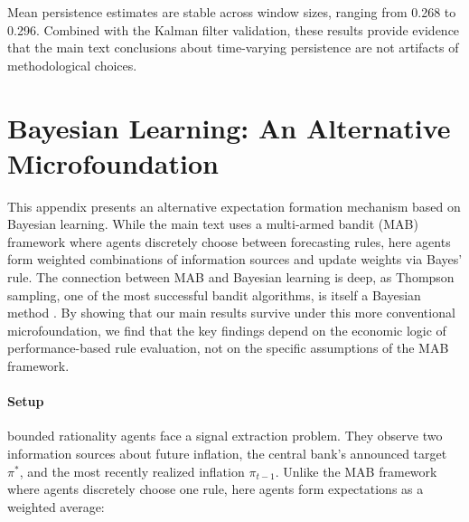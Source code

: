 \documentclass[10pt]{article}
\begin{document}
Mean persistence estimates are stable across window sizes, ranging from 0.268 to 0.296. Combined with the Kalman filter validation, these results provide evidence that the main text conclusions about time-varying persistence are not artifacts of methodological choices.



\section{Bayesian Learning: An Alternative Microfoundation}
\label{app:bayesian}

This appendix presents an alternative expectation formation mechanism based on Bayesian learning. While the main text uses a multi-armed bandit (MAB) framework where agents discretely choose between forecasting rules, here agents form weighted combinations of information sources and update weights via Bayes' rule. The connection between MAB and Bayesian learning is deep, as Thompson sampling, one of the most successful bandit algorithms, is itself a Bayesian method \citep{thompson1933, agrawal2012}. By showing that our main results survive under this more conventional microfoundation, we find that the key findings depend on the economic logic of performance-based rule evaluation, not on the specific assumptions of the MAB framework.

\paragraph{Setup} bounded rationality agents face a signal extraction problem. They observe two information sources about future inflation, the central bank's announced target $\pi^*$, and the most recently realized inflation $\pi_{t-1}$. Unlike the MAB framework where agents discretely choose one rule, here agents form expectations as a weighted average:
\end{document}
